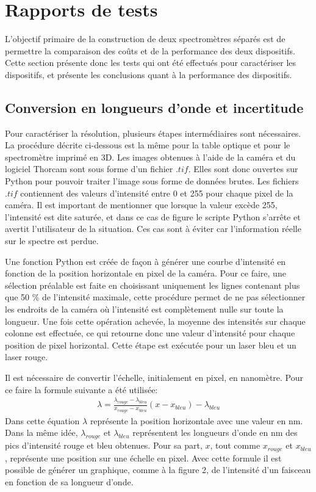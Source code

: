\documentclass[11pt,letterpaper]{article}
\begin{document}
\section{Rapports de tests}

L'objectif primaire de la construction de deux spectromètres séparés est de permettre la 
comparaison des coûts et de la performance des deux dispositifs. Cette section présente
donc les tests qui ont été effectués pour caractériser les dispositifs, et présente les 
conclusions quant à la performance des dispositifs.

\subsection{Conversion en longueurs d'onde et incertitude}

Pour caractériser la résolution, plusieurs étapes intermédiaires sont nécessaires. La procédure décrite ci-dessous est la même 
pour la table optique et pour le spectromètre imprimé en 3D. 
Les images obtenues à l'aide de la caméra et du logiciel Thorcam sont sous forme d'un fichier $.tif$.
Elles sont donc ouvertes sur Python pour pouvoir traiter l'image sous forme de données brutes. Les fichiers $.tif$ 
contiennent des valeurs d'intensité entre 0 et 255 pour chaque pixel de la caméra. Il est important de mentionner
que lorsque la valeur excède 255, l'intensité est dite saturée, et dans ce cas de figure le scripte Python s'arrête et 
avertit l'utilisateur de la situation. Ces cas sont à éviter car l'information réelle sur le spectre est perdue.

Une fonction Python est créée de façon à générer une courbe d'intensité en fonction de la position horizontale 
en pixel de la caméra. Pour ce faire, une sélection préalable est faite en choisissant uniquement les lignes 
contenant plus que 50 \% de l'intensité maximale, cette procédure permet de ne pas sélectionner les endroits de la caméra 
où l'intensité est complètement nulle sur toute la longueur. Une fois cette opération achevée, la moyenne des intensités sur chaque
colonne est effectuée, ce qui retourne donc une valeur d'intensité pour chaque position de pixel horizontal. Cette étape est exécutée pour 
un laser bleu et un laser rouge.

Il est nécessaire de convertir l'échelle, initialement en pixel, en nanomètre.
Pour ce faire la formule suivante a été utilisée: 
\begin{align}\label{eq1}
  \lambda =\frac{\lambda _{rouge}-\lambda _{bleu}}{x_{rouge}-x_{bleu}}(x-x_{bleu})-\lambda _{bleu}
\end{align}
Dans cette équation $\lambda $ représente la position horizontale avec une valeur en nm. Dans la même idée, 
$\lambda _{rouge}$ et $\lambda _{bleu}$ représentent les longueurs d'onde en nm des pics d'intensité rouge et bleu obtenues. 
Pour sa part, $x$, tout comme $x_{rouge}$ et $x_{bleu}$, représente une position sur une échelle en pixel.
Avec cette formule il est possible de générer un graphique, comme à la figure 2, de l'intensité d'un faisceau en fonction 
de sa longueur d'onde. 
\end{document}
